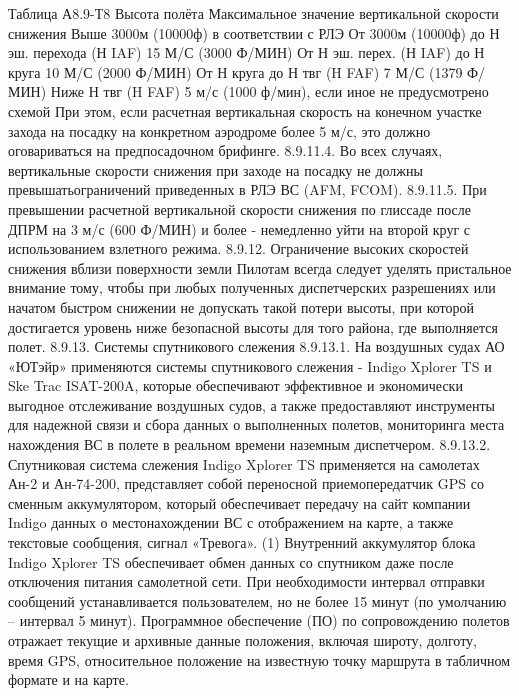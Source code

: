                                                                                                                                                     Таблица А8.9-Т8
                           Высота полёта	Максимальное значение вертикальной
скорости снижения
  Выше 3000м (10000ф)	в соответствии с РЛЭ
  От 3000м (10000ф) до Н эш. перехода (Н IAF)	15 М/С (3000 Ф/МИН)
  От Н эш. перех. (Н IAF) до Н круга	10 М/С (2000 Ф/МИН)
  От Н круга до Н твг (H FAF)	7 М/С (1379 Ф/МИН)
  Ниже Н твг (H FAF)	5 м/с (1000 ф/мин), если иное не   предусмотрено схемой
При этом, если расчетная вертикальная скорость на конечном участке захода на посадку на конкретном аэродроме более 5 м/с, это должно оговариваться на предпосадочном брифинге.
8.9.11.4. Во всех случаях, вертикальные скорости снижения при заходе на посадку не должны превышатьограничений приведенных в РЛЭ ВС (AFM, FCOM).
8.9.11.5. При превышении расчетной вертикальной скорости снижения по глиссаде после ДПРМ на 3 м/с (600 Ф/МИН) и более - немедленно уйти на второй круг с использованием взлетного режима.
8.9.12.	Ограничение высоких скоростей снижения вблизи поверхности земли
Пилотам всегда следует уделять пристальное внимание тому, чтобы при любых полученных диспетчерских разрешениях или начатом быстром снижении не допускать такой потери высоты, при которой достигается уровень ниже безопасной высоты для того района, где выполняется полет.
8.9.13.	Системы спутникового слежения
8.9.13.1. На воздушных судах АО «ЮТэйр» применяются системы спутникового слежения - Indigo Xplorer TS и Ske Trac ISAT-200A, которые обеспечивают эффективное и экономически выгодное отслеживание воздушных судов, а также предоставляют инструменты для надежной связи и сбора данных о выполненных полетов, мониторинга места нахождения ВС в полете в реальном времени наземным диспетчером.
8.9.13.2. Спутниковая система слежения Indigo Xplorer TS применяется на самолетах Ан-2 и Ан-74-200, представляет собой переносной приемопередатчик GPS со сменным аккумулятором, который обеспечивает передачу на сайт компании Indigo данных о местонахождении ВС с отображением на карте, а также текстовые сообщения, сигнал «Тревога».
(1) Внутренний аккумулятор блока Indigo Xplorer TS обеспечивает обмен данных со спутником даже после отключения питания самолетной сети. При необходимости интервал отправки сообщений устанавливается пользователем, но не более 15 минут (по умолчанию – интервал 5 минут).
Программное обеспечение (ПО) по сопровождению полетов отражает текущие и архивные данные
положения, включая широту, долготу, время GPS, относительное положение на известную точку маршрута в табличном формате и на карте.
